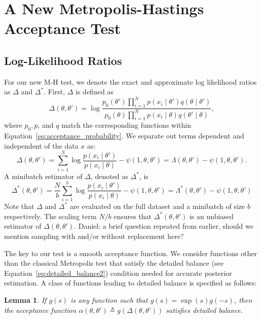 \documentclass{article}
\newtheorem{lemma}{Lemma}
\begin{document}
\section{A New Metropolis-Hastings Acceptance Test}\label{sec:our_algorithm}

\subsection{Log-Likelihood Ratios}\label{ssec:log_likelihood_ratios}

For our new M-H test, we denote the exact and approximate log likelihood ratios
as $\Delta$ and $\Delta^*$.  First, $\Delta$ is defined as
\begin{equation}\label{eq:delta1}
    \Delta(\theta,\theta')  =
    \log \frac{p_0(\theta')\prod_{i=1}^N p(x_i \mid \theta')q(\theta \mid
    \theta')}{p_0(\theta)\prod_{i=1}^N p(x_i \mid \theta)q(\theta' \mid\theta)},
\end{equation}
where $p_0, p$, and $q$ match the corresponding functions within
Equation~\ref{eq:acceptance_probability}. We separate out terms dependent and
independent of the data $x$ as:
\begin{equation}\label{eq:delta2}
    \Delta(\theta,\theta') = \sum_{i=1}^N\log\frac{p(x_i\mid\theta')}{p(x_i\mid\theta)} - \psi(1,\theta,\theta') =
    \Lambda(\theta,\theta') - \psi(1,\theta,\theta').
\end{equation}
A minibatch estimator of $\Delta$, denoted as $\Delta^*$, is
\begin{equation}\label{eq:delta3}
    \Delta^*(\theta,\theta') =
\frac{N}{b}\sum_{i=1}^b\log\frac{p(x_i\mid\theta')}{p(x_i\mid\theta)} - \psi(1,\theta,\theta') =
\Lambda^*(\theta,\theta') - \psi(1,\theta,\theta')
\end{equation}
Note that $\Delta$ and $\Delta^*$ are evaluated on the full dataset and a
minibatch of size $b$ respectively. The scaling term $N/b$ ensures that
$\Delta^*(\theta,\theta')$ is an unbiased estimator of $\Delta(\theta,\theta')$.
{\color{blue} Daniel: a brief question repeated from earlier, should we mention
sampling with and/or without replacement here?}

The key to our test is a smooth acceptance function.  We consider functions
other than the classical Metropolis test that satisfy the detailed balance (see
Equation~\ref{eq:detailed_balance2}) condition needed for accurate posterior
estimation. A class of functions leading to detailed balance is specified as
follows:

\begin{lemma}\label{lem:detailed_balance}
    If $g(s)$ is any function such that $g(s) = \exp(s) g(-s)$, then the
    acceptance function $\alpha(\theta,\theta') \triangleq
    g(\Delta(\theta,\theta'))$ satisfies detailed balance.
\end{lemma}
\end{document}
